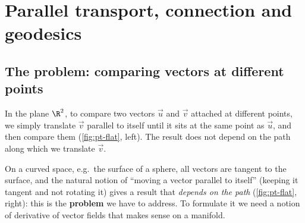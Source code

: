 \chapter{Parallel transport, connection and geodesics}\label{ch:connection}

\section{The problem: comparing vectors at different points}

In the plane $\R^2$, to compare two vectors $\vec u$ and $\vec v$ attached at different points, we simply translate $\vec v$ parallel to itself until it sits at the same point as $\vec u$, and then compare them (\cref{fig:pt-flat}, left). The result does not depend on the path along which we translate $\vec v$.

On a curved space, e.g.\ the surface of a sphere, all vectors are tangent to the surface, and the natural notion of ``moving a vector parallel to itself'' (keeping it tangent and not rotating it) gives a result that \emph{depends on the path} (\cref{fig:pt-flat}, right): this is the \textbf{problem} we have to address. To formulate it we need a notion of derivative of vector fields that makes sense on a manifold.

